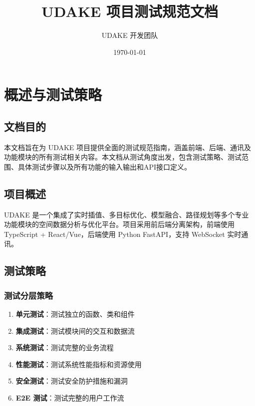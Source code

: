\documentclass[12pt,a4paper,openany]{report}
\title{\textbf{UDAKE 项目测试规范文档}}
\author{UDAKE 开发团队}
\date{\today}
\begin{document}
\setcounter{tocdepth}{3}
\setcounter{secnumdepth}{3}

\maketitle
\thispagestyle{empty}

\tableofcontents

\chapter{概述与测试策略}

\section{文档目的}

本文档旨在为 UDAKE 项目提供全面的测试规范指南，涵盖前端、后端、通讯及功能模块的所有测试相关内容。本文档从测试角度出发，包含测试策略、测试范围、具体测试步骤以及所有功能的输入输出和API接口定义。

\section{项目概述}

UDAKE 是一个集成了实时插值、多目标优化、模型融合、路径规划等多个专业功能模块的空间数据分析与优化平台。项目采用前后端分离架构，前端使用 TypeScript + React/Vue，后端使用 Python FastAPI，支持 WebSocket 实时通讯。

\section{测试策略}

\subsection{测试分层策略}

\begin{enumerate}
    \item \textbf{单元测试}：测试独立的函数、类和组件
    \item \textbf{集成测试}：测试模块间的交互和数据流
    \item \textbf{系统测试}：测试完整的业务流程
    \item \textbf{性能测试}：测试系统性能指标和资源使用
    \item \textbf{安全测试}：测试安全防护措施和漏洞
    \item \textbf{E2E 测试}：测试完整的用户工作流
\end{enumerate}
\end{document}
